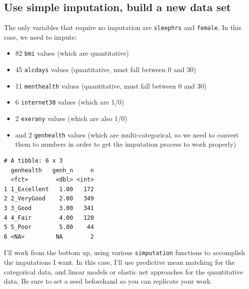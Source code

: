 \documentclass[]{book}
\newenvironment{Shaded}{\begin{snugshade}}{\end{snugshade}}
\newcommand{\KeywordTok}[1]{\textcolor[rgb]{0.13,0.29,0.53}{\textbf{#1}}}
\newcommand{\DataTypeTok}[1]{\textcolor[rgb]{0.13,0.29,0.53}{#1}}
\newcommand{\StringTok}[1]{\textcolor[rgb]{0.31,0.60,0.02}{#1}}
\newcommand{\OperatorTok}[1]{\textcolor[rgb]{0.81,0.36,0.00}{\textbf{#1}}}
\newcommand{\NormalTok}[1]{#1}
\providecommand{\tightlist}{%
  \setlength{\itemsep}{0pt}\setlength{\parskip}{0pt}}
\theoremstyle{definition}
\theoremstyle{definition}
\theoremstyle{definition}
\theoremstyle{remark}
\begin{document}
\subsection{Use simple imputation, build a new data
set}\label{use-simple-imputation-build-a-new-data-set-1}

The only variables that require no imputation are \texttt{sleephrs} and
\texttt{female}. In this case, we need to impute:

\begin{itemize}
\tightlist
\item
  82 \texttt{bmi} values (which are quantitative)
\item
  45 \texttt{alcdays} values (quantitative, must fall between 0 and 30)
\item
  11 \texttt{menthealth} values (quantitative, must fall between 0 and
  30)
\item
  6 \texttt{internet30} values (which are 1/0)
\item
  2 \texttt{exerany} values (which are also 1/0)
\item
  and 2 \texttt{genhealth} values (which are multi-categorical, so we
  need to convert them to numbers in order to get the imputation process
  to work properly)
\end{itemize}

\begin{Shaded}
\end{Shaded}

\begin{verbatim}
# A tibble: 6 x 3
  genhealth   genh_n     n
  <fct>        <dbl> <int>
1 1_Excellent   1.00   172
2 2_VeryGood    2.00   349
3 3_Good        3.00   341
4 4_Fair        4.00   120
5 5_Poor        5.00    44
6 <NA>         NA        2
\end{verbatim}

I'll work from the bottom up, using various \texttt{simputation}
functions to accomplish the imputations I want. In this case, I'll use
predictive mean matching for the categorical data, and linear models or
elastic net approaches for the quantitative data. Be sure to set a seed
beforehand so you can replicate your work.
\end{document}
